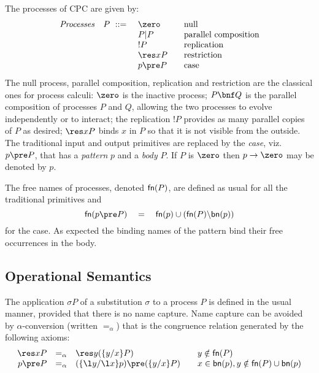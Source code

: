 \documentclass{LMCS}
\begin{document}
The processes of CPC are given by:
\[
\begin{array}{lll}
{\it Processes}\quad P \ ::= \
&	\zero					& \mbox{null} \\
&	P|P						& \mbox{parallel composition} \\
&	!P						& \mbox{replication} \\
&	\res x P			& \mbox{restriction} \\
&	p\pre P	\quad	& \mbox{case}
\end{array}
\]The null process, parallel composition, replication and restriction
are the classical ones for process calculi: $\zero$ is the inactive
process; $P\bnf Q$ is the parallel composition of processes $P$ and
$Q$, allowing the two processes to evolve independently or to
interact; the replication $!P$ provides as many parallel copies of $P$
as desired; $\res x P$ binds $x$ in $P$ so that it is not visible from
the outside.  The
traditional input and output primitives are replaced by the {\em
  case}, viz.  $p\pre P$, that has a {\em  pattern} $p$ and a {\em body} $P$.  If
$P$ is $\zero$ then $p\to \zero$ may be denoted by $p$.


The free names of processes, denoted ${\sf fn}(P)$, are defined as
usual for all the traditional primitives and
\[
{\sf fn}(p\pre P) \quad =\quad {\sf fn}(p)\cup({\sf fn}(P)\backslash{\sf bn}(p))
\]for the case. As expected the binding names of the pattern bind their free occurrences in the body.


\subsection{Operational Semantics}
\label{s:reduction-new}

The application $\sigma P$ of a substitution $\sigma$ to a process $P$
is defined in the usual manner, provided that there is no name
capture.
Name capture can be avoided by $\alpha$-conversion (written $=_\alpha$) that
is the congruence relation generated by the following axioms:
\[
\begin{array}{rcll}
\res x P &=_\alpha& \res y (\{y/x\}P) & \quad y\notin{\sf fn}(P)\\
p\pre P &=_\alpha& (\{\l y/\l x\}p)\pre (\{y/x\}P) & 
			\quad x\in{\sf bn}(p),y\notin{\sf fn}(P)\cup{\sf bn}(p)
\end{array}
\]
\end{document}
